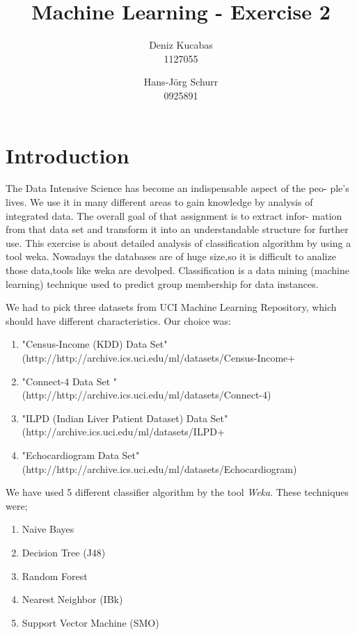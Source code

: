 \documentclass[a4paper]{article}
\begin{document}
\title{Machine Learning - Exercise 2 }
\author{
        Deniz Kucabas \\ 
                     1127055 
                    \and
                    Hans-Jörg Schurr \\ 0925891
}

\maketitle
\tableofcontents
\newpage

\section{Introduction}
The Data Intensive Science has become an indispensable aspect of the peo-
ple's lives. We use it in many different areas to gain knowledge by analysis
of integrated data. The overall goal of that assignment is to extract infor-
mation from that data set and transform it into an understandable structure
for further use. This exercise is about detailed analysis of classification algorithm by using a tool weka.
Nowadays the databases are of huge size,so it is difficult to analize those data,tools like weka are 
devolped. Classification is a data mining (machine learning) technique used 
to predict group membership for data instances. 

We had to pick three datasets from UCI Machine Learning Repository, which should have different characteristics. 
Our choice was:
\begin{enumerate}
    \item "Census-Income (KDD) Data Set" \\ 
(http://http://archive.ics.uci.edu/ml/datasets/Census-Income+%
    \item "Connect-4 Data Set " \\
        (http://http://archive.ics.uci.edu/ml/datasets/Connect-4)
    \item "ILPD (Indian Liver Patient Dataset) Data Set"\\
        (http://archive.ics.uci.edu/ml/datasets/ILPD+%
    \item "Echocardiogram  Data Set" \\
        (http://http://archive.ics.uci.edu/ml/datasets/Echocardiogram)
\end{enumerate}

We have used 5 different classifier algorithm by the tool \emph{Weka}. 
These techniques were;
\begin{enumerate}
    \item Naive Bayes
    \item Decision Tree (J48)
    \item Random Forest
    \item Nearest Neighbor (IBk)
    \item Support Vector Machine (SMO)
\end{enumerate}
\end{document}
